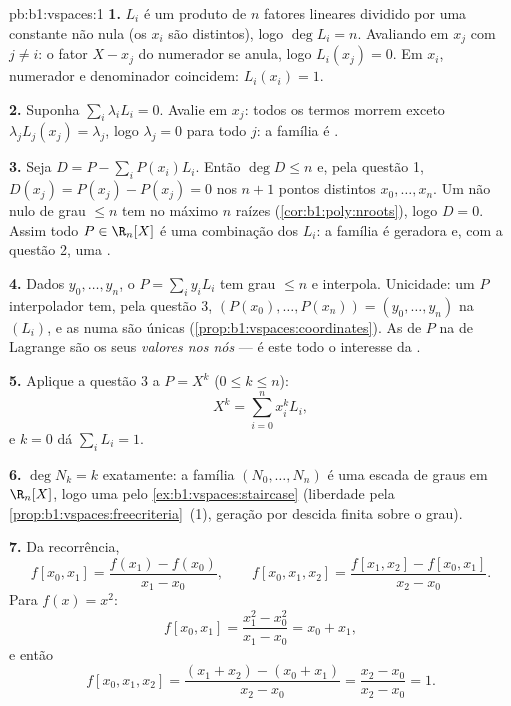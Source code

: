 \begin{solution}{pb:b1:vspaces:1}
\textbf{1.} $L_i$ é um produto de $n$ fatores lineares dividido por
uma constante não nula (os $x_i$ são distintos), logo $\deg L_i = n$.
Avaliando em $x_j$ com $j \neq i$: o fator $X - x_j$ do numerador se
anula, logo $L_i(x_j) = 0$. Em $x_i$, numerador e denominador coincidem:
$L_i(x_i) = 1$.

\textbf{2.} Suponha $\sum_i \lambda_i L_i = 0$. Avalie em $x_j$: todos os termos morrem
exceto $\lambda_j L_j(x_j) = \lambda_j$, logo $\lambda_j = 0$ para todo $j$: a família é .

\textbf{3.} Seja $D = P - \sum_i P(x_i) L_i$. Então $\deg D \leq n$ e, pela questão 1, $D(x_j) = P(x_j) - P(x_j) = 0$ nos
$n + 1$ pontos distintos $x_0, \dots, x_n$. Um  não nulo de grau
$\leq n$ tem no máximo $n$ raízes (\cref{cor:b1:poly:nroots}), logo $D = 0$. Assim todo
$P \in \R_n[X]$ é uma combinação dos $L_i$: a família é geradora e, com a
questão 2, uma .

\textbf{4.} Dados $y_0, \dots, y_n$, o  $P = \sum_i
y_i L_i$ tem grau $\leq n$ e
interpola. Unicidade: um $P$ interpolador tem, pela questão 3,
 $(P(x_0), \dots,
P(x_n)) = (y_0, \dots, y_n)$ na  $(L_i)$, e as  numa  são
únicas (\cref{prop:b1:vspaces:coordinates}). As  de $P$ na  de Lagrange são os
seus \emph{valores nos nós} --- é este todo o interesse da .

\textbf{5.} Aplique a questão 3 a $P = X^k$ ($0 \leq k \leq n$):
\[
X^k = \sum_{i=0}^{n} x_i^{k} L_i ,
\]
e $k = 0$ dá $\sum_i L_i = 1$.

\textbf{6.} $\deg N_k = k$ exatamente: a família $(N_0, \dots, N_n)$
é uma escada de graus em $\R_n[X]$, logo uma  pelo
\cref{ex:b1:vspaces:staircase} (liberdade pela \cref{prop:b1:vspaces:freecriteria}~(1), geração por descida finita sobre o
grau).

\textbf{7.} Da recorrência,
\[
f[x_0, x_1] = \frac{f(x_1) - f(x_0)}{x_1 - x_0},
\qquad
f[x_0, x_1, x_2] = \frac{f[x_1, x_2] - f[x_0, x_1]}{x_2 - x_0}.
\]
Para $f(x) = x^2$:
\[
f[x_0, x_1] = \frac{x_1^2 - x_0^2}{x_1 - x_0} = x_0 + x_1,
\]
e então
\[
f[x_0, x_1, x_2]
= \frac{(x_1 + x_2) - (x_0 + x_1)}{x_2 - x_0}
= \frac{x_2 - x_0}{x_2 - x_0} = 1 .
\]


\end{solution}
